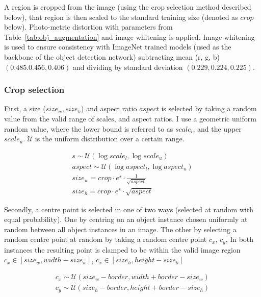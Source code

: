A region is cropped from the image (using the crop selection method described below), that region is then scaled to the standard training size (denoted as $crop$ below). Photo-metric distortion with parameters from Table~\ref{tab:obj_augmentation} and image whitening is applied. Image whitening is used to ensure consistency with ImageNet trained models (used as the backbone of the object detection network) subtracting mean (r, g, b) $ (0.485. 0.456, 0.406) $ and dividing by standard deviation $ (0.229, 0.224, 0.225) $.

\subsubsection{Crop selection}

First, a size ($size_w, size_h$) and aspect ratio $aspect$ is selected by taking a random value from the valid range of scales, and aspect ratios. I use a geometric uniform random value, where the lower bound is referred to as $scale_l$, and the upper $scale_u$. $\mathcal{U}$ is the uniform distribution over a certain range.

\begin{equation}
\begin{split}
    s \sim \mathcal{U}(\log scale_l, \log scale_u)\\
    aspect \sim \mathcal{U}(\log aspect_l, \log aspect_u)\\
    size_w = crop \cdot e^s \cdot \frac{1}{\sqrt{aspect}} \\
    size_h = crop \cdot e^s \cdot \sqrt{aspect}
\end{split}
\label{eq:random_crop}
\end{equation}

Secondly, a centre point is selected in one of two ways (selected at random with equal probability). One by centring on an object instance chosen uniformly at random between all object instances in an image. The other by selecting a random centre point at random by taking a random centre point $c_x$, $c_y$, In both instances the resulting point is clamped to be within the valid image region $c_x \in [size_w, width - size_w]$, $c_x \in [size_h, height - size_h]$

\begin{equation}
\begin{split}
    c_x \sim \mathcal{U}(size_w - border, width + border - size_w)\\
    c_y \sim \mathcal{U}(size_h - border, height + border - size_h)\\
\end{split}
\label{eq:random_crop2}
\end{equation}

